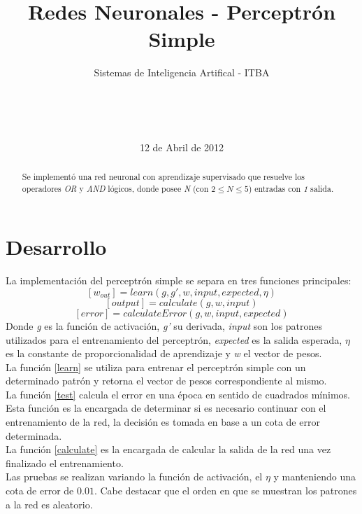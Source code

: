 \documentclass{sig-alternate}
\begin{document}
\title{Redes Neuronales - Perceptr\'on Simple}
\subtitle{Sistemas de Inteligencia Artifical - ITBA}


\author{
	\\
	\\
	\\	
}

\date{12 de Abril de 2012}

\maketitle

\begin{abstract}
	Se implement\'o una red neuronal con aprendizaje supervisado que resuelve los operadores \textit{OR}  y \textit{AND} l\'ogicos, donde posee \textit{N} (con $2\leq N \leq 5$) entradas con \textit{1} salida.\\
\end{abstract}

\section*{Desarrollo}

La implementaci\'on del perceptr\'on simple se separa en tres funciones principales:
	\begin{equation}
		\label{learn}
			[ w_{out} ] = learn( g, g', w, input, expected, \eta )
		\end{equation}
		\begin{equation}
		\label{calculate}
			[ output ] = calculate( g, w, input )
		\end{equation}
		\begin{equation}
		\label{test}
			[ error ] = calculateError( g, w, input, expected)
		\end{equation}
Donde \textit{g} es la funci\'on de activaci\'on, \textit{g'} su derivada, \textit{input} son los patrones utilizados para el entrenamiento del perceptr\'on, \textit{expected} es la salida esperada, $\eta$ es la constante de proporcionalidad de aprendizaje y \textit{w} el vector de pesos. \\
La funci\'on \ref{learn} se utiliza para entrenar el perceptr\'on simple con un determinado patr\'on y retorna el vector de pesos correspondiente al mismo. \\
La funci\'on \ref{test} calcula el error en una \'epoca en sentido de cuadrados m\'inimos. Esta funci\'on es la encargada de determinar si es necesario continuar con el entrenamiento de la red, la decisi\'on es tomada en base a un cota de error determinada. \\
La funci\'on \ref{calculate} es la encargada de calcular la salida de la red una vez finalizado el entrenamiento. \\
Las pruebas se realizan variando la funci\'on de activaci\'on, el $\eta$ y manteniendo una cota de error de $0.01$. Cabe destacar que el orden en que se muestran los patrones a la red es aleatorio.
\end{document}
